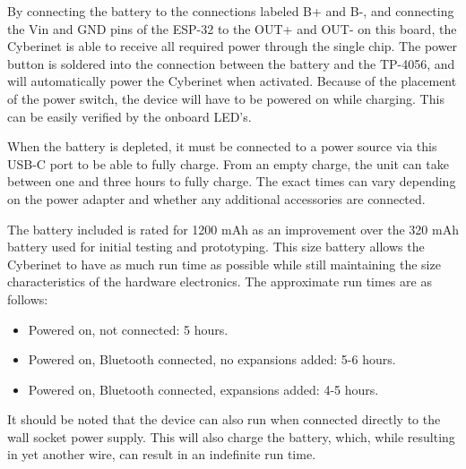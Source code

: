 By connecting the battery to the connections labeled B+ and B-, and connecting the Vin and GND pins of the ESP-32 to the OUT+ and OUT- on this board, the Cyberinet is able to receive all required power through the single chip. The power button is soldered into the connection between the battery and the TP-4056, and will automatically power the Cyberinet when activated. Because of the placement of the power switch, the device will have to be powered on while charging. This can be easily verified by the onboard LED's. 

When the battery is depleted, it must be connected to a power source via this USB-C port to be able to fully charge. From an empty charge, the unit can take between one and three hours to fully charge. The exact times can vary depending on the power adapter and whether any additional accessories are connected. 

The battery included is rated for 1200 mAh as an improvement over the 320 mAh battery used for initial testing and prototyping. This size battery allows the Cyberinet to have as much run time as possible while still maintaining the size characteristics of the hardware electronics. The approximate run times are as follows:

\begin{itemize}
    \item Powered on, not connected: 5 hours.
    \item Powered on, Bluetooth connected, no expansions added: 5-6 hours.
    \item Powered on, Bluetooth connected, expansions added: 4-5 hours.
\end{itemize}


It should be noted that the device can also run when connected directly to the wall socket power supply. This will also charge the battery, which, while resulting in yet another wire, can result in an indefinite run time.

